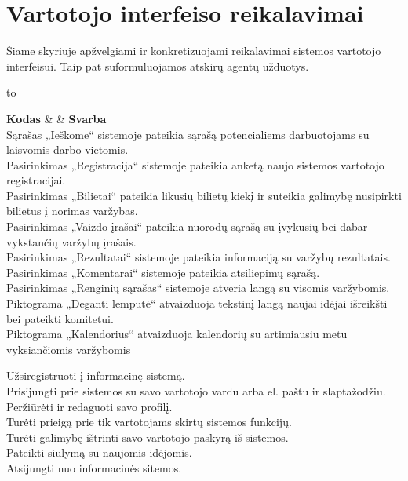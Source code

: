 \documentclass{VUMIFPSkursinis}
\begin{document}
\section{Vartotojo interfeiso reikalavimai} \label{vartotojoInterfeisoReikalavimai}
  Šiame skyriuje apžvelgiami ir konkretizuojami reikalavimai sistemos vartotojo interfeisui. Taip pat suformuluojamos atskirų agentų užduotys.
  \begin{longtabu} to 
    \caption{Vartotojo interfeiso reikalavimai}
    \label{table:interfeisoReikalavimai}
    \endfirsthead
    \endhead
    \hline
    \textbf{Kodas} &  & \textbf{Svarba} \\
    \hline
    {
      Sąrašas „Ieškome“ sistemoje pateikia sąrašą potencialiems darbuotojams su laisvomis darbo vietomis. \\
      Pasirinkimas „Registracija“ sistemoje pateikia anketą naujo sistemos vartotojo registracijai. \\
      Pasirinkimas „Bilietai“ pateikia likusių bilietų kiekį ir suteikia galimybę nusipirkti bilietus į norimas varžybas. \\
      Pasirinkimas „Vaizdo įrašai“ pateikia nuorodų sąrašą su įvykusių bei dabar vykstančių varžybų įrašais. \\
      Pasirinkimas „Rezultatai“ sistemoje pateikia informaciją su varžybų rezultatais. \\
      Pasirinkimas „Komentarai“ sistemoje pateikia atsiliepimų sąrašą. \\
	  Pasirinkimas „Renginių sąrašas“ sistemoje atveria langą su visomis varžybomis. \\
      Piktograma „Deganti lemputė“ atvaizduoja tekstinį langą naujai idėjai išreikšti bei pateikti komitetui. \\
      Piktograma „Kalendorius“ atvaizduoja kalendorių su artimiausiu metu vyksiančiomis varžybomis
    }

    {
      Užsiregistruoti į informacinę sistemą. \\
      Prisijungti prie sistemos su savo vartotojo vardu arba el. paštu ir slaptažodžiu. \\
      Peržiūrėti ir redaguoti savo profilį. \\
      Turėti prieigą prie tik vartotojams skirtų sistemos funkcijų. \\
      Turėti galimybę ištrinti savo vartotojo paskyrą iš sistemos. \\
      Pateikti siūlymą su naujomis idėjomis. \\
      Atsijungti nuo informacinės sitemos.
    }


\end{longtabu}
\end{document}
